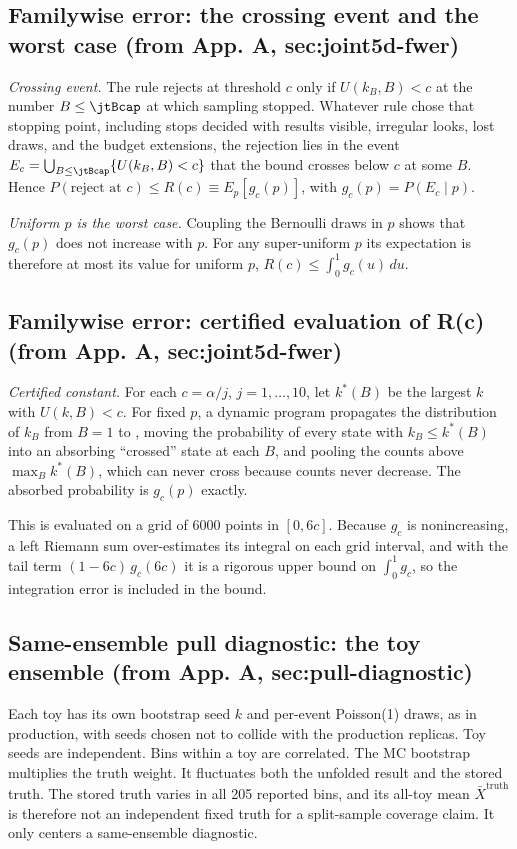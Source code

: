 \subsection{Familywise error: the crossing event and the worst case (from App. A, sec:joint5d-fwer)}
\emph{Crossing event.}  The rule rejects at threshold $c$ only if $U(k_{B},B)<c$ at the number $B\le\jtBcap$ at which sampling stopped.  Whatever rule chose that stopping point, including stops decided with results visible, irregular looks, lost draws, and the budget extensions, the rejection lies in the event $E_{c}=\bigcup_{B\le\jtBcap}\{U(k_{B},B)<c\}$ that the bound crosses below $c$ at some $B$.  Hence $P(\text{reject at }c)\le R(c)\equiv E_{p}[g_{c}(p)]$, with $g_{c}(p)=P(E_{c}\mid p)$.

\emph{Uniform $p$ is the worst case.}  Coupling the Bernoulli draws in $p$ shows that $g_{c}(p)$ does not increase with $p$.  For any super-uniform $p$ its expectation is therefore at most its value for uniform $p$, $R(c)\le\int_{0}^{1}g_{c}(u)\,du$.

\subsection{Familywise error: certified evaluation of R(c) (from App. A, sec:joint5d-fwer)}
\emph{Certified constant.}  For each $c=\alpha/j$, $j=1,\dots,10$, let $k^{*}(B)$ be the largest $k$ with $U(k,B)<c$.  For fixed $p$, a dynamic program propagates the distribution of $k_{B}$ from $B=1$ to \jtBcap{}, moving the probability of every state with $k_{B}\le k^{*}(B)$ into an absorbing ``crossed'' state at each $B$, and pooling the counts above $\max_{B}k^{*}(B)$, which can never cross because counts never decrease. The absorbed probability is $g_{c}(p)$ exactly.

This is evaluated on a grid of 6000 points in $[0,6c]$.  Because $g_{c}$ is nonincreasing, a left Riemann sum over-estimates its integral on each grid interval, and with the tail term $(1-6c)\,g_{c}(6c)$ it is a rigorous upper bound on $\int_{0}^{1}g_{c}$, so the integration error is included in the bound.

\subsection{Same-ensemble pull diagnostic: the toy ensemble (from App. A, sec:pull-diagnostic)}
 Each toy has its own bootstrap seed $k$ and per-event Poisson(1) draws, as in production, with seeds chosen not to collide with the production replicas. Toy seeds are independent. Bins within a toy are correlated. The MC bootstrap multiplies the truth weight. It fluctuates both the unfolded result and the stored truth. The stored truth varies in all 205 reported bins, and its all-toy mean $\bar X^{\text{truth}}$ is therefore not an independent fixed truth for a split-sample coverage claim. It only centers a same-ensemble diagnostic.

